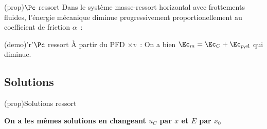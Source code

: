 \documentclass[../../main/main.tex]{subfiles}
\begin{document}
\begin{tcbraster}[raster columns=2, raster equal height=rows]
	\begin{tcb}[label=prop:emecacons,
			list entry={\lte\theprop~:~Bilan de puissance ressort}
		](prop){$\Pc$ ressort}
		Dans le système masse-ressort horizontal avec frottements fluides,
		l'énergie mécanique diminue progressivement proportionellement au
		coefficient de friction $\alpha$~:
	\end{tcb}
	\begin{tcb}[label=demo:emecacons
		list entry={\lte\thedemo~:~Bilan de puissance ressort}
		](demo)'r'{$\Pc$ ressort}
		À partir du PFD $\times v$~:
		On a bien $\Ec_m = \Ec_C + \Ec_{p, \rm el}$ qui diminue.
	\end{tcb}
\end{tcbraster}

\subsection{Solutions}
\begin{center}
	\begin{tcb}[label=prop:ressortsolu](prop){Solutions ressort}
		\begin{center}
			\textbf{On a les mêmes solutions en changeant $u_C$ par $x$ et $E$
				par $x_0$}
		\end{center}
	\end{tcb}
\end{center}
\end{document}
